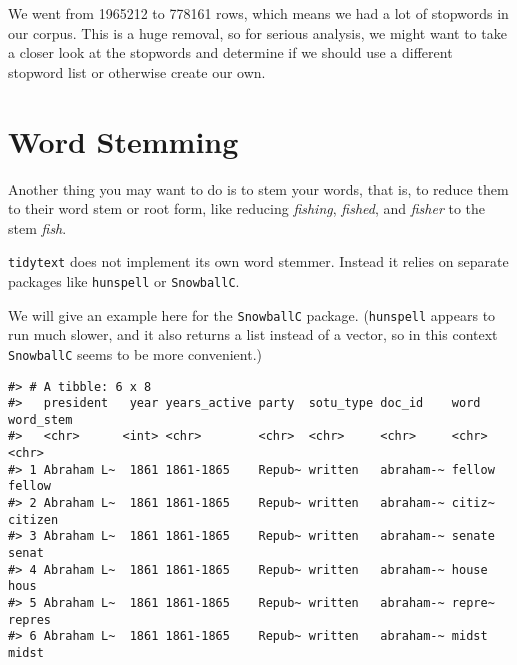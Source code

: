 \documentclass[]{book}
\newenvironment{Shaded}{\begin{snugshade}}{\end{snugshade}}
\newcommand{\DataTypeTok}[1]{\textcolor[rgb]{0.13,0.29,0.53}{#1}}
\newcommand{\KeywordTok}[1]{\textcolor[rgb]{0.13,0.29,0.53}{\textbf{#1}}}
\newcommand{\NormalTok}[1]{#1}
\newcommand{\OperatorTok}[1]{\textcolor[rgb]{0.81,0.36,0.00}{\textbf{#1}}}
\newcommand{\StringTok}[1]{\textcolor[rgb]{0.31,0.60,0.02}{#1}}
\begin{document}
We went from 1965212 to 778161 rows, which means we had a lot of stopwords in our corpus. This is a huge removal, so for serious analysis, we might want to take a closer look at the stopwords and determine if we should use a different stopword list or otherwise create our own.

\hypertarget{word-stemming}{%
\section{Word Stemming}\label{word-stemming}}

Another thing you may want to do is to stem your words, that is, to reduce them to their word stem or root form, like reducing \emph{fishing}, \emph{fished}, and \emph{fisher} to the stem \emph{fish}.

\texttt{tidytext} does not implement its own word stemmer. Instead it relies on separate packages like \texttt{hunspell} or \texttt{SnowballC}.

We will give an example here for the \texttt{SnowballC} package. (\texttt{hunspell} appears to run much slower, and it also returns a list instead of a vector, so in this context \texttt{SnowballC} seems to be more convenient.)

\begin{Shaded}
\end{Shaded}

\begin{verbatim}
#> # A tibble: 6 x 8
#>   president   year years_active party  sotu_type doc_id    word   word_stem
#>   <chr>      <int> <chr>        <chr>  <chr>     <chr>     <chr>  <chr>    
#> 1 Abraham L~  1861 1861-1865    Repub~ written   abraham-~ fellow fellow   
#> 2 Abraham L~  1861 1861-1865    Repub~ written   abraham-~ citiz~ citizen  
#> 3 Abraham L~  1861 1861-1865    Repub~ written   abraham-~ senate senat    
#> 4 Abraham L~  1861 1861-1865    Repub~ written   abraham-~ house  hous     
#> 5 Abraham L~  1861 1861-1865    Repub~ written   abraham-~ repre~ repres   
#> 6 Abraham L~  1861 1861-1865    Repub~ written   abraham-~ midst  midst
\end{verbatim}
\end{document}
